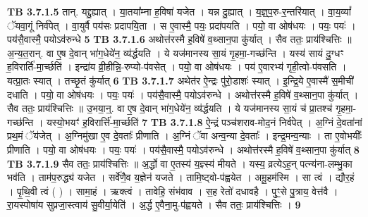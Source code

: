 \documentclass[17pt]{extarticle}
\begin{document}
{{{{{{{{{{{{{{{{{{{                                \textbf{ TB 3.7.1.5} \newline
                  तान्. यद्दु॒ह्यात् । या॒तया᳚म्ना ह॒विषा॑ यजेत । यन्न दु॒ह्यात् । य॒ज्ञ्॒प॒रु-र॒न्तरि॑यात् । वा॒य॒व्यां᳚ ॅयवा॒गूं निर्व॑पेत् । वा॒युर्वै पय॑सः प्रदापयि॒ता । स ए॒वास्मै॒ पयः॒ प्रदा॑पयति । पयो॒ वा ओष॑धयः । पयः॒ पयः॑ । पय॑सै॒वास्मै॒ पयोऽव॑रुन्धे \textbf{ 5} \newline
                  \newline
                                \textbf{ TB 3.7.1.6} \newline
                  अथोत्त॑रस्मै ह॒विषे॑ व॒थ्सान॒पा कु॑र्यात् । सैव ततः॒ प्राय॑श्चित्तिः ॥ अ॒न्य॒त॒रान्. वा ए॒ष दे॒वान् भा॑ग॒धेये॑न॒ व्य॑र्द्धयति । ये यज॑मानस्य सा॒यं गृ॒हमा॒-गच्छ॑न्ति । यस्य॑ सायं दु॒ग्धꣳ ह॒विरार्ति॑-मा॒र्च्छति॑ । इन्द्रा॑य व्री॒हीन्नि॒-रुप्यो-प॑वसेत् । पयो॒ वा ओष॑धयः । पय॑ ए॒वारभ्य॑ गृही॒त्वो-प॑वसति । यत्प्रा॒तः स्यात् । तच्छृ॒तं कु॑र्यात् \textbf{ 6} \newline
                  \newline
                                \textbf{ TB 3.7.1.7} \newline
                  अथेत॑र ऐ॒न्द्रः पु॑रो॒डाशः॑ स्यात् । इ॒न्द्रि॒ये ए॒वास्मै॑ स॒मीची॑ दधाति । पयो॒ वा ओष॑धयः । पयः॒ पयः॑ । पय॑सै॒वास्मै॒ पयोऽव॑रुन्धे । अथोत्त॑रस्मै ह॒विषे॑ व॒थ्सान॒पा कु॑र्यात् । सैव ततः॒ प्राय॑श्चित्तिः ॥ उ॒भया॒न्॒. वा ए॒ष दे॒वान् भा॑ग॒धेये॑न॒ व्य॑र्द्धयति । ये यज॑मानस्य सा॒यं च॑ प्रा॒तश्च॑ गृ॒हमा॒-गच्छ॑न्ति । यस्यो॒भयꣳ॑ ह॒विरार्त्ति॑-मा॒र्च्छति॑ \textbf{ 7} \newline
                  \newline
                                \textbf{ TB 3.7.1.8} \newline
                  ऐ॒न्द्रं पञ्च॑शराव-मोद॒नं निर्व॑पेत् । अ॒ग्निं दे॒वता॑नां प्रथ॒मं ॅय॑जेत् । अ॒ग्निमु॑खा ए॒व दे॒वताः᳚ प्रीणाति । अ॒ग्निं ॅवा अन्व॒न्या दे॒वताः᳚ । इन्द्र॒मन्व॒न्याः । ता ए॒वोभयीः᳚ प्रीणाति । पयो॒ वा ओष॑धयः । पयः॒ पयः॑ । पय॑सै॒वास्मै॒ पयोऽव॑रुन्धे । अथोत्त॑रस्मै ह॒विषे॑ व॒थ्सान॒पा कु॑र्यात् \textbf{ 8} \newline
                  \newline
                                \textbf{ TB 3.7.1.9} \newline
                  सैव ततः॒ प्राय॑श्चित्तिः ॥ अ॒र्द्धो वा ए॒तस्य॑ य॒ज्ञ्स्य॑ मीयते । यस्य॒ व्रत्येऽह॒न् पत्न्य॑ना-लम्भु॒का भव॑ति । ताम॑प॒रुद्ध्य॑ यजेत । सर्वे॑णै॒व य॒ज्ञेन॑ यजते । तामि॒ष्ट्वो-प॑ह्वयेत । अमू॒हम॑स्मि । सा त्वं । द्यौर॒हं । पृ॒थि॒वी त्वं ( ) । सामा॒हं । ऋक्त्वं । तावेहि॒ संभ॑वाव । स॒ह रेतो॑ दधावहै । पुꣳ॒॒से पु॒त्राय॒ वेत्त॑वै । रा॒यस्पोषा॑य सुप्रजा॒स्त्वाय॑ सु॒वीर्या॒येति॑ । अ॒र्द्ध ए॒वैना॒मु-प॑ह्वयते । सैव ततः॒ प्राय॑श्चित्तिः । \textbf{ 9} \newline
}}}}}}}}}}}}}}}}}}}
\end{document}
